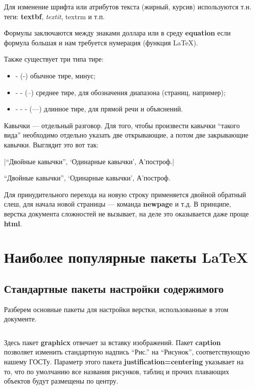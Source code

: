 Для изменение шрифта или атрибутов текста (жирный, курсив) используются т.н. теги: \textbf{textbf}, \textit{textit}, \textrm{textrm} и т.п.

Формулы заключаются между знаками доллара или в среду \textbf{equation} если формула большая и нам требуется нумерация (функция \LaTeX).

Также существует три типа тире:

\begin{itemize}
    \item - (-) обычное тире, минус;
    \item - - (--) среднее тире, для обозначения диапазона (страниц, например);
    \item - - - (---) длинное тире, для прямой речи и объяснений.
\end{itemize}

Кавычки --- отдельный разговор. Для того, чтобы произвести кавычки ``такого вида'' необходимо отдельно указать две открывающие, а потом две закрывающие кавычки. Выглядит это вот так:

|``Двойные кавычки'', `Одинарные кавычки', А'построф.|

``Двойные кавычки'', `Одинарные кавычки', А'построф.

Для принудительного перехода на новую строку применяется двойной обратный слеш, для начала новой страницы --- команда \textbf{newpage} и т.д. В принципе, верстка документа сложностей не вызывает, на деле это оказывается даже проще \textbf{html}.

\section{Наиболее популярные пакеты \LaTeX}
\label{sec:ext}

\subsection{Стандартные пакеты настройки содержимого}

Разберем основные пакеты для настройки верстки, использованные в этом документе.

\inputminted[breaklines,firstline=8,lastline=15,fontsize=\small]{latex}{../preamble.tex}

Здесь пакет \textbf{graphicx} отвечает за вставку изображений. Пакет \textbf{caption} позволяет изменить стандартную надпись ``Рис.'' на ``Рисунок'', соответствующую нашему ГОСТу. Параметр этого пакета \textbf{justification=centering} указывает на то, что по умолчанию все названия рисунков, таблиц и прочих плавающих объектов будут размещены по центру.

